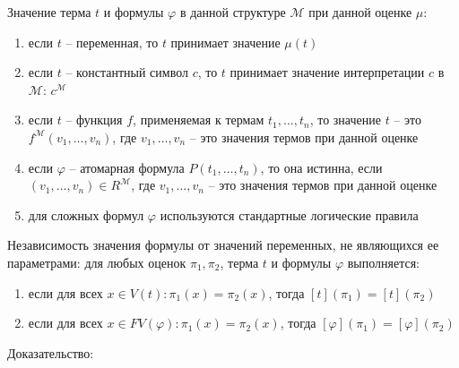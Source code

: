 \documentclass[a4paper, 10pt]{article}
\newcommand{\MM}{\mathcal{M}}
\begin{document}
Значение терма $t$ и формулы $\varphi$ в данной структуре $\MM$ при данной оценке $\mu$: 
\begin{enumerate}
    \item если $t$ -- переменная, то $t$ принимает значение $\mu(t)$
    \item если $t$ -- константный символ $c$, то $t$ принимает значение интерпретации $c$ в $\MM$: $c^\MM$
    \item если $t$ -- функция $f$, применяемая к термам $t_1,\ldots,t_n$, то значение $t$ -- это $f^\MM(v_1,\ldots,v_n)$, где $v_1,\ldots,v_n$ -- это значения термов при данной оценке
    \item если $\varphi$ -- атомарная формула $P(t_1,\ldots,t_n)$, то она истинна, если $(v_1,\ldots,v_n)\in R^\MM$, где $v_1,\ldots,v_n$ -- это значения термов при данной оценке
    \item для сложных формул $\varphi$ используются стандартные логические правила
\end{enumerate}

Независимость значения формулы от значений переменных, не являющихся ее параметрами: для любых оценок $\pi_1,\pi_2$, терма $t$ и формулы $\varphi$ выполняется:
\begin{enumerate}
    \item если для всех $x\in V(t) \colon \pi_1(x)=\pi_2(x)$, тогда $[t](\pi_1)=[t](\pi_2)$
    \item если для всех $x\in FV(\varphi) \colon \pi_1(x)=\pi_2(x)$, тогда $[\varphi](\pi_1)=[\varphi](\pi_2)$
\end{enumerate}

Доказательство:
\end{document}
